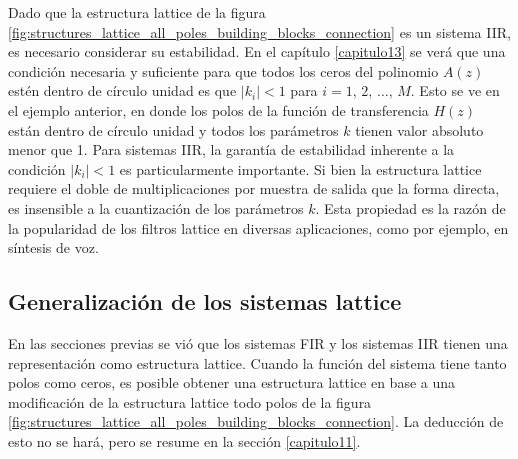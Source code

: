 \documentclass[a4paper]{report}
\begin{document}
Dado que la estructura lattice de la figura \ref{fig:structures_lattice_all_poles_building_blocks_connection} es un sistema IIR, es necesario considerar su estabilidad. En el capítulo \ref{capitulo13} se verá que una condición necesaria y suficiente para que todos los ceros del polinomio \(A(z)\) estén dentro de círculo unidad es que \(|k_i|<1\) para \(i=1,\,2,\,\dots,\,M\). Esto se ve en el ejemplo anterior, en donde los polos de la función de transferencia \(H(z)\) están dentro de círculo unidad y todos los parámetros \(k\) tienen valor absoluto menor que 1. Para sistemas IIR, la garantía de estabilidad inherente a la condición \(|k_i|<1\) es particularmente importante. Si bien la estructura lattice requiere el doble de multiplicaciones por muestra de salida que la forma directa, es insensible a la cuantización de los parámetros \(k\). Esta propiedad es la razón de la popularidad de los filtros lattice en diversas aplicaciones, como por ejemplo, en síntesis de voz.

\subsection{Generalización de los sistemas lattice}

En las secciones previas se vió que los sistemas FIR y los sistemas IIR tienen una representación como estructura lattice. Cuando la función del sistema tiene tanto polos como ceros, es posible obtener una estructura lattice en base a una modificación de la estructura lattice todo polos de la figura \ref{fig:structures_lattice_all_poles_building_blocks_connection}. La deducción de esto no se hará, pero se resume en la sección \ref{capitulo11}.





































 

 
 
 
 
 
 
 



\end{document}
